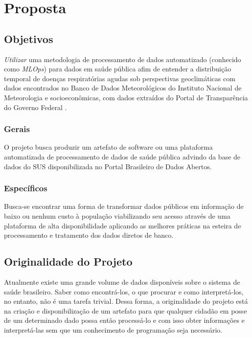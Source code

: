 \documentclass[journal]{IEEEtran}
\begin{document}

\section{Proposta}

\subsection{Objetivos}

\emph{Utilizar} uma metodologia de processamento de dados automatizado (conhecido como \emph{MLOps}) para dados em saúde pública afim de entender a distribuição temporal de doenças respiratórias agudas sob perspectivas geoclimáticas com dados encontrados no Banco de Dados Meteorológicos do Instituto Nacional de Meteorologia\cite{bdmep_2020} e socioeconômicas, com dados extraídos do Portal de Transparência do Governo Federal \cite{PortalTransparência2020}.

\subsubsection{Gerais}
O projeto busca produzir um artefato de software ou uma plataforma automatizada de processamento de dados de saúde pública advindo da base de dados do SUS disponibilizada no Portal Brasileiro de Dados Abertos\cite{DadosGov}.


\subsubsection{Específicos}
Busca-se encontrar uma forma de transformar dados públicos em informação de baixo ou nenhum custo à população viabilizando seu acesso através de uma plataforma de alta disponibilidade aplicando as melhores práticas na esteira de processamento e tratamento dos dados diretos de banco.
\subsection{Originalidade do Projeto}
Atualmente existe uma grande volume de dados disponíveis sobre o sistema de saúde brasileiro. Saber como encontrá-los, o que procurar e como interpretá-los, no entanto, não é uma tarefa trivial. Dessa forma, a originalidade do projeto está na criação e disponibilização de um artefato para que qualquer cidadão em posse de um determinado dado possa então processá-lo e com isso obter informações e interpretá-las sem que um conhecimento de programação seja necessário.
\end{document}
